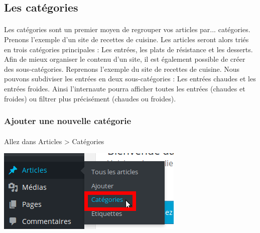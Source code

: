 \documentclass[10pt,a4paper]{article}
\begin{document}
\subsection{Les catégories}
\paragraph{}Les catégories sont un premier moyen de regrouper vos articles par... catégories. Prenons l'exemple d'un site de recettes de cuisine. Les articles seront alors triés en trois catégories principales : Les entrées, les plats de résistance et les desserts. Afin de mieux organiser le contenu d'un site, il est également possible de créer des sous-catégories. Reprenons l'exemple du site de recettes de cuisine. Nous pouvons subdiviser les entrées en deux sous-catégories : Les entrées chaudes et les entrées froides. Ainsi l'internaute pourra afficher toutes les entrées (chaudes et froides) ou filtrer plus précisément (chaudes ou froides).
\subsubsection{Ajouter une nouvelle catégorie}
\paragraph{}Allez dans Articles > Catégories
\begin{center}
\includegraphics[scale=0.3]{img/0089.png}
\end{center}
\end{document}
